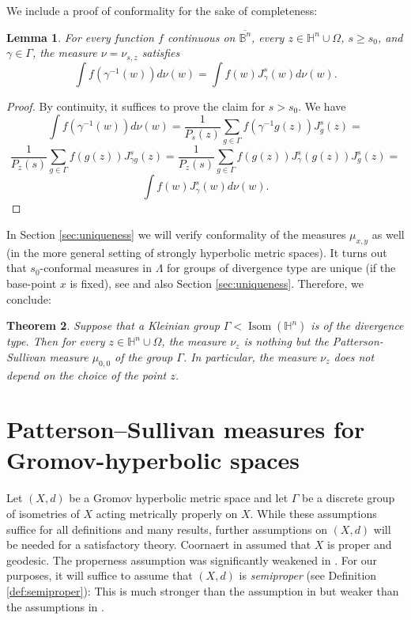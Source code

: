 \documentclass[12pt]{amsbook}%
\newtheorem{thm}{Theorem}[chapter]
\newtheorem{lem}[thm]{Lemma}
\theoremstyle{definition}
\theoremstyle{remark}
\numberwithin{section}{chapter}
\numberwithin{subsection}{section}
\numberwithin{figure}{chapter}
\DeclareMathOperator{\Isom}{Isom}
\def\bH{{\mathbb{H}}}
\def\Ga{\Gamma}
\def\ga{\gamma}
\def\La{\Lambda}
\def\Om{\Omega}
\def\ol{\overline}
\begin{document}
{{We include a proof of conformality for the sake of completeness:


\begin{lem}\label{lem:J-conformal}
For every function $f$ continuous on $\ol{\mathbb B^n}$, every $z\in  \bH^n\cup \Omega$, $s\geqslant s_0$, and $\gamma\in \Ga$, the measure $\nu=\nu_{s,z}$ satisfies 
$$
\int f(\ga^{-1}(w))d\nu(w)= \int f(w)J^s_\ga(w)d\nu(w). 
$$  
\end{lem}
\begin{proof} By continuity, it suffices to prove the claim for $s> s_0$. We have
$$
\int f(\ga^{-1}(w))d\nu(w)= \frac{1}{P_s(z)}\sum_{g\in \Ga} f(\ga^{-1}g(z))J^s_g(z)=
$$
$$
 \frac{1}{P_z(s)}\sum_{g\in \Ga} f(g(z))J^s_{\ga g}(z)=   
\frac{1}{P_z(s)}\sum_{g\in \Ga} f(g(z)) J^s_\ga(g(z)) J^s_g(z)=
$$
$$
\int f(w)J^s_\ga(w)d\nu(w). 
$$
\end{proof}

In Section \ref{sec:uniqueness} we will verify conformality of the measures $\mu_{x,y}$ as well (in the more general setting of strongly hyperbolic metric spaces). It turns out that $s_0$-conformal measures in $\La$ for groups of divergence type are unique (if the base-point $x$ is fixed), see 
\cite[Theorem 4.2.1]{nicholls} and also Section \ref{sec:uniqueness}. Therefore, we conclude: 

\begin{thm}\label{thm:alt-PS}
Suppose that a Kleinian group $\Ga< \Isom(\bH^n)$ is of the divergence type. Then for every $z\in \bH^n\cup \Om$, the measure $\nu_z$ is nothing but the Patterson-Sullivan measure $\mu_{0,0}$ of the group $\Ga$. In particular, the measure $\nu_z$  does not depend on the choice of the point $z$. 
\end{thm}


\section{Patterson--Sullivan measures for Gromov-hyperbolic spaces}\label{sec:reviewPS} 


Let $(X,d)$ be a Gromov hyperbolic metric space and let $\Gamma$ be a discrete group of 
isometries of $X$ acting metrically properly on  $X$. While these assumptions suffice for all definitions and many results, further assumptions on $(X,d)$ will be needed for a satisfactory theory. Coornaert in \cite{Coo93} assumed that $X$ is 
proper and geodesic. The properness assumption was significantly weakened in \cite{DSU}. For our purposes, it will suffice to assume that $(X,d)$ is {\em semiproper} (see Definition \ref{def:semiproper}): This is much stronger than the assumption in \cite{DSU} but weaker than the assumptions in \cite{Coo93}. 



}}
\end{document}
